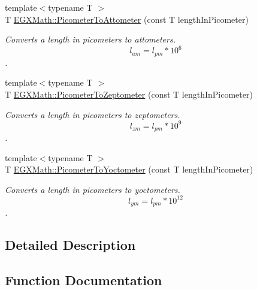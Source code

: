 \begin{DoxyCompactItemize}
{\footnotesize template$<$typename T $>$ }\\T \mbox{\hyperlink{group___e_g_x_math-_conversions-_length_conversions-_picometer-_s_i_gaa71938201fdcd55422eb1b12de6aa043}{E\+G\+X\+Math\+::\+Picometer\+To\+Attometer}} (const T length\+In\+Picometer)
\begin{DoxyCompactList}\small\item\em Converts a length in picometers to attometers. \[ l_{am}=l_{pm} * 10^{6} \]. \end{DoxyCompactList}\item 
{\footnotesize template$<$typename T $>$ }\\T \mbox{\hyperlink{group___e_g_x_math-_conversions-_length_conversions-_picometer-_s_i_ga6aa4200739cdc21650592e995e8945cd}{E\+G\+X\+Math\+::\+Picometer\+To\+Zeptometer}} (const T length\+In\+Picometer)
\begin{DoxyCompactList}\small\item\em Converts a length in picometers to zeptometers. \[ l_{zm}=l_{pm} * 10^{9} \]. \end{DoxyCompactList}\item 
{\footnotesize template$<$typename T $>$ }\\T \mbox{\hyperlink{group___e_g_x_math-_conversions-_length_conversions-_picometer-_s_i_ga503eda76d6647261c50ec147c78dfbbc}{E\+G\+X\+Math\+::\+Picometer\+To\+Yoctometer}} (const T length\+In\+Picometer)
\begin{DoxyCompactList}\small\item\em Converts a length in picometers to yoctometers. \[ l_{ym}=l_{pm} * 10^{12} \]. \end{DoxyCompactList}\end{DoxyCompactItemize}


\subsection{Detailed Description}


\subsection{Function Documentation}
\mbox{\label{group___e_g_x_math-_conversions-_length_conversions-_picometer-_s_i_gaa71938201fdcd55422eb1b12de6aa043}} 
